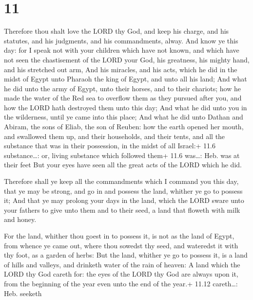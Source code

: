 \hypertarget{section-10}{%
\section{11}\label{section-10}}

 Therefore thou shalt love the LORD thy God, and keep his
charge, and his statutes, and his judgments, and his commandments,
alway.  And know ye this day: for I speak not with your
children which have not known, and which have not seen the chastisement
of the LORD your God, his greatness, his mighty hand, and his stretched
out arm,  And his miracles, and his acts, which he did in
the midst of Egypt unto Pharaoh the king of Egypt, and unto all his
land;  And what he did unto the army of Egypt, unto their
horses, and to their chariots; how he made the water of the Red sea to
overflow them as they pursued after you, and how the LORD hath destroyed
them unto this day;  And what he did unto you in the
wilderness, until ye came into this place;  And what he did
unto Dathan and Abiram, the sons of Eliab, the son of Reuben: how the
earth opened her mouth, and swallowed them up, and their households, and
their tents, and all the substance that was in their possession, in the
midst of all Israel:+ 11.6 substance\ldots: or, living substance which
followed them+ 11.6 was\ldots: Heb. was at their feet  But
your eyes have seen all the great acts of the LORD which he did.

 Therefore shall ye keep all the commandments which I
command you this day, that ye may be strong, and go in and possess the
land, whither ye go to possess it;  And that ye may prolong
your days in the land, which the LORD sware unto your fathers to give
unto them and to their seed, a land that floweth with milk and honey.

 For the land, whither thou goest in to possess it, is
not as the land of Egypt, from whence ye came out, where thou sowedst
thy seed, and wateredst it with thy foot, as a garden of herbs:
 But the land, whither ye go to possess it, is a land of
hills and valleys, and drinketh water of the rain of heaven:
 A land which the LORD thy God careth for: the eyes of the
LORD thy God are always upon it, from the beginning of the year even
unto the end of the year.+ 11.12 careth\ldots: Heb. seeketh

